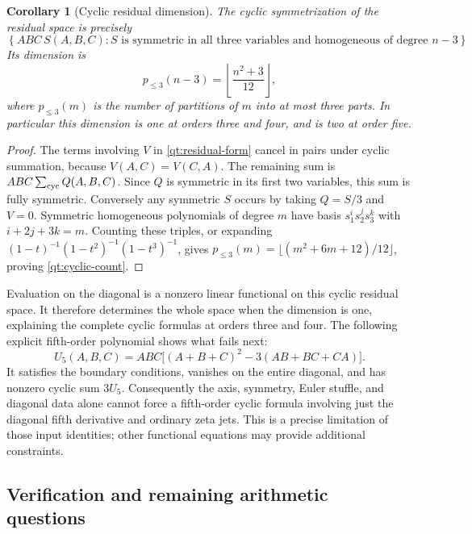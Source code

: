 \documentclass[11pt]{article}
\numberwithin{equation}{section}
\newtheorem{corollary}[theorem]{Corollary}
\theoremstyle{definition}
\theoremstyle{remark}
\begin{document}
\begin{corollary}[Cyclic residual dimension]\label{qt:cyclic-dimension}
The cyclic symmetrization of the residual space is precisely
\[
 \left\{ABC\,S(A,B,C): S\text{ is symmetric in all three variables
 and homogeneous of degree }n-3\right\}.
\]
Its dimension is
\begin{equation}\label{qt:cyclic-count}
 p_{\le3}(n-3)=\left\lfloor\frac{n^2+3}{12}\right\rfloor,
\end{equation}
where $p_{\le3}(m)$ is the number of partitions of $m$ into at most
three parts. In particular this dimension is one at orders three and
four, and is two at order five.
\end{corollary}
\begin{proof}
The terms involving $V$ in \eqref{qt:residual-form} cancel in pairs
under cyclic summation, because $V(A,C)=V(C,A)$. The remaining sum is
$ABC\sum_{\rm cyc}Q(A,B,C)$. Since $Q$ is symmetric in its first
two variables, this sum is fully symmetric. Conversely any symmetric
$S$ occurs by taking $Q=S/3$ and $V=0$. Symmetric homogeneous
polynomials of degree $m$ have basis $s_1^i s_2^j s_3^k$ with
$i+2j+3k=m$. Counting these triples, or expanding
$(1-t)^{-1}(1-t^2)^{-1}(1-t^3)^{-1}$, gives
$p_{\le3}(m)=\lfloor(m^2+6m+12)/12\rfloor$, proving
\eqref{qt:cyclic-count}.
\end{proof}

Evaluation on the diagonal is a nonzero linear functional on this
cyclic residual space. It therefore determines the whole space when
the dimension is one, explaining the complete cyclic formulas at
orders three and four. The following explicit fifth-order polynomial
shows what fails next:
\begin{equation}\label{qt:fifth-obstruction}
 U_5(A,B,C)=ABC\bigl[(A+B+C)^2-3(AB+BC+CA)\bigr].
\end{equation}
It satisfies the boundary conditions, vanishes on the entire diagonal,
and has nonzero cyclic sum $3U_5$. Consequently the axis, symmetry,
Euler stuffle, and diagonal data alone cannot force a fifth-order
cyclic formula involving just the diagonal fifth derivative and
ordinary zeta jets. This is a precise limitation of those input
identities; other functional equations may provide additional
constraints.

\subsection{Verification and remaining arithmetic questions}
\end{document}
